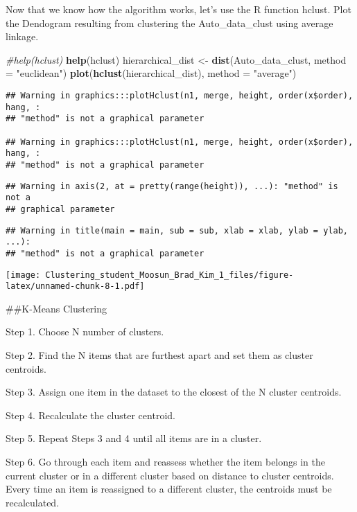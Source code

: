 \documentclass[11pt,]{article}
\newenvironment{Shaded}{\begin{snugshade}}{\end{snugshade}}
\newcommand{\CommentTok}[1]{\textcolor[rgb]{0.56,0.35,0.01}{\textit{#1}}}
\newcommand{\DataTypeTok}[1]{\textcolor[rgb]{0.13,0.29,0.53}{#1}}
\newcommand{\KeywordTok}[1]{\textcolor[rgb]{0.13,0.29,0.53}{\textbf{#1}}}
\newcommand{\NormalTok}[1]{#1}
\newcommand{\StringTok}[1]{\textcolor[rgb]{0.31,0.60,0.02}{#1}}
\begin{document}
Now that we know how the algorithm works, let's use the R function
hclust. Plot the Dendogram resulting from clustering the
Auto\_data\_clust using average linkage.

\begin{Shaded}
\begin{Highlighting}[]
\CommentTok{#help(hclust)}
\KeywordTok{help}\NormalTok{(hclust)}
\NormalTok{hierarchical_dist <-}\StringTok{ }\KeywordTok{dist}\NormalTok{(Auto_data_clust, }\DataTypeTok{method =} \StringTok{"euclidean"}\NormalTok{)}
\KeywordTok{plot}\NormalTok{(}\KeywordTok{hclust}\NormalTok{(hierarchical_dist), }\DataTypeTok{method =} \StringTok{"average"}\NormalTok{)}
\end{Highlighting}
\end{Shaded}

\begin{verbatim}
## Warning in graphics:::plotHclust(n1, merge, height, order(x$order), hang, :
## "method" is not a graphical parameter

## Warning in graphics:::plotHclust(n1, merge, height, order(x$order), hang, :
## "method" is not a graphical parameter
\end{verbatim}

\begin{verbatim}
## Warning in axis(2, at = pretty(range(height)), ...): "method" is not a
## graphical parameter
\end{verbatim}

\begin{verbatim}
## Warning in title(main = main, sub = sub, xlab = xlab, ylab = ylab, ...):
## "method" is not a graphical parameter
\end{verbatim}

\texttt{[image: Clustering\_student\_Moosun\_Brad\_Kim\_1\_files/figure-latex/unnamed-chunk-8-1.pdf]}

\newpage

\#\#K-Means Clustering

Step 1. Choose N number of clusters.

Step 2. Find the N items that are furthest apart and set them as cluster
centroids.

Step 3. Assign one item in the dataset to the closest of the N cluster
centroids.

Step 4. Recalculate the cluster centroid.

Step 5. Repeat Steps 3 and 4 until all items are in a cluster.

Step 6. Go through each item and reassess whether the item belongs in
the current cluster or in a different cluster based on distance to
cluster centroids. Every time an item is reassigned to a different
cluster, the centroids must be recalculated.
\end{document}
